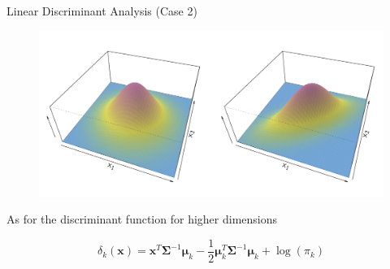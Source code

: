 \documentclass{beamer}
\begin{document}
\begin{frame}{Linear Discriminant Analysis (Case 2)}
	 \begin{figure}[h]
		\centering
		\includegraphics[scale=0.35]{../../Figures/fig_multiv_gauss.png}
	\end{figure}
	
	
	As for the discriminant function for higher dimensions
	
	\begin{equation*}
		\delta_k(\bm{x})= \bm{x}^T \bm{\Sigma}^{-1} \bm{\mu}_k - \frac{1}{2} \bm{\mu}_k^T \bm{\Sigma}^{-1}\bm{\mu}_k + \log(\pi_k)
	\end{equation*}
\end{frame}
\end{document}
